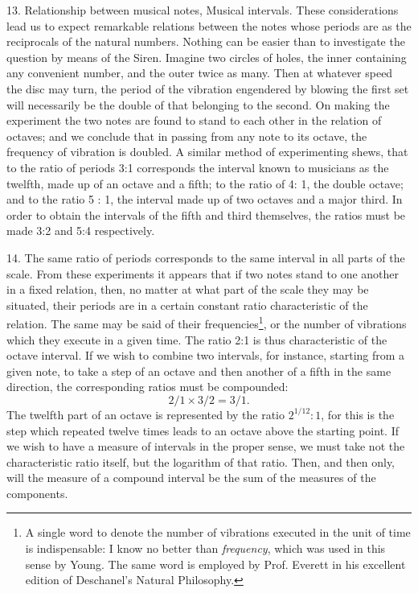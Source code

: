 13.  Relationship between musical notes, Musical intervals.  These
considerations lead us to expect remarkable relations between the notes whose
periods are as the reciprocals of the natural numbers.  Nothing can be easier
than to investigate the question by means of the Siren. Imagine two circles of
holes, the inner containing any convenient number, and the outer twice as many.
Then at whatever speed the disc may turn, the period of the vibration
engendered by blowing the first set will necessarily be the double of that
belonging to the second. On making the experiment the two notes are found to
stand to each other in the relation of octaves; and we conclude that in passing
from any note to its octave, the frequency of vibration is doubled. A similar
method of experimenting shews, that to the ratio of periods 3:1 corresponds the
interval known to musicians as the twelfth, made up of an octave and a fifth;
to the ratio of 4: 1, the double octave; and to the ratio 5 : 1, the interval
made up of two octaves and a major third. In order to obtain the intervals of
the fifth and third themselves, the ratios must be made 3:2 and 5:4
respectively.

14.  The same ratio of periods corresponds to the same interval in all parts of
the scale.  From these experiments it appears that if two notes stand to one
another in a fixed relation, then, no matter at what part of the scale they may
be situated, their periods are in a certain constant ratio characteristic of
the relation. The same may be said of their frequencies\footnote{A single word
to denote the number of vibrations executed in the unit of time is
indispensable: I know no better than \textit{frequency}, which was used in this
sense by Young. The same word is employed by Prof. Everett in his excellent
edition of Deschanel's Natural Philosophy.}, or the number of vibrations which
they execute in a given time. The ratio 2:1 is thus characteristic of the
octave interval. If we wish to combine two intervals, for instance, starting
from a given note, to take a step of an octave and then another of a fifth in
the same direction, the corresponding ratios must be compounded:
\[ 2/1 \times 3/2 = 3/1.\]
The twelfth part of an octave is represented by the ratio
\(2^{1/12}:1\), for this is the step which repeated twelve times leads to an
octave above the starting point. If we wish to have a measure of intervals in
the proper sense, we must take not the characteristic ratio itself, but the
logarithm of that ratio. Then, and then only, will the measure of a compound
interval be the sum of the measures of the components.

